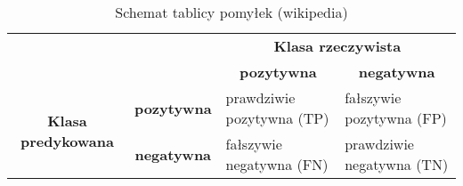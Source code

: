 \begin{table}[h]
	\centering
	
	\begin{threeparttable}
		\caption{Schemat tablicy pomyłek (wikipedia)}
		\label{tab:tab2}
				
		\begin{tabularx}{1\textwidth}{ |c|c|X|X| }\hline
		  \multicolumn{2}{|c|}{\multirow{2}{*}{}} & \multicolumn{2}{|c|}{\textbf{Klasa rzeczywista}}\\ \cline{3-4}
      
		  \multicolumn{2}{|c|}{} & \multicolumn{1}{|c|}{\textbf{pozytywna}} & \multicolumn{1}{c|}{\textbf{negatywna}}\\ \hline
       
		  \multirow{2}{*}{\textbf{Klasa predykowana}} & \textbf{pozytywna} & prawdziwie pozytywna (TP) & fałszywie pozytywna (FP)\\ \cline{2-4}
      
		   & \textbf{negatywna} & fałszywie negatywna (FN) & prawdziwie negatywna (TN)\\ \hline
		\end{tabularx}

	\end{threeparttable}
\end{table}

